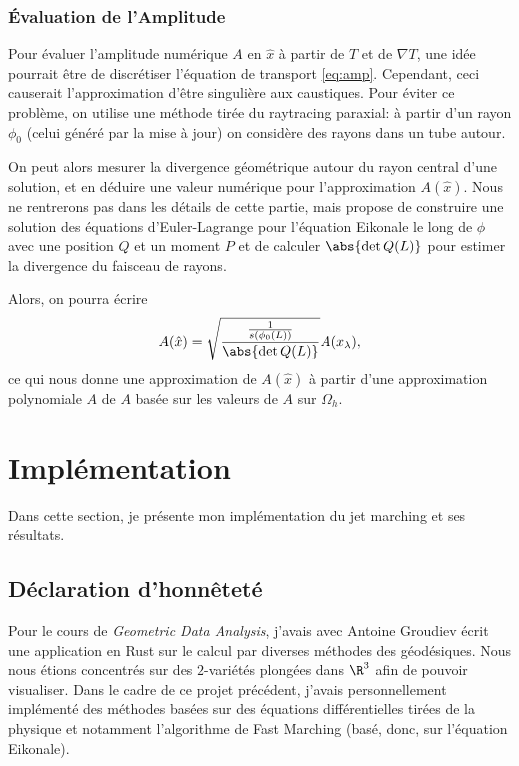 \documentclass[math, info]{mpb-cours}
\begin{document}
\subsubsection{Évaluation de l'Amplitude}
Pour évaluer l'amplitude numérique $A$ en $\hat{x}$ à partir de $T$ et de $\nabla T$, une idée pourrait
être de discrétiser l'équation de transport \eqref{eq:amp}.
Cependant, ceci causerait l'approximation d'être singulière aux caustiques.
Pour éviter ce problème, on utilise une méthode tirée du raytracing paraxial: à partir d'un rayon
$\phi_{0}$ (celui généré par la mise à jour) on considère des rayons dans un tube autour.

On peut alors mesurer la divergence géométrique autour du rayon central d'une solution, et en déduire une
valeur numérique pour l'approximation $A(\hat{x})$.
Nous ne rentrerons pas dans les détails de cette partie, mais \cite{potter2021jetmarchingmethodssolving}
propose de construire une solution des équations d'Euler-Lagrange pour l'équation Eikonale le long de
$\phi$ avec une position $Q$ et un moment $P$ et de calculer $\abs{\det Q(L)}$ pour estimer la
divergence du faisceau de rayons.

Alors, on pourra écrire
\begin{equation}
	A(\hat{x}) = \sqrt{\frac{\frac{1}{s(\phi_{0}(L))}}{\abs{\det Q(L)}}}\mathit{A}(x_{\lambda}),
\end{equation}
ce qui nous donne une approximation de $A(\hat{x})$ à partir d'une approximation polynomiale $\mathit{A}$
de $A$ basée sur les valeurs de $A$ sur $\Omega_{h}$.

\newpage

\section{Implémentation}
Dans cette section, je présente mon implémentation du jet marching et ses résultats.

\subsection{Déclaration d'honnêteté}
Pour le cours de \textit{Geometric Data Analysis}, j'avais avec Antoine Groudiev écrit une application
en Rust sur le calcul par diverses méthodes des géodésiques.
Nous nous étions concentrés sur des $2$-variétés plongées dans $\R^{3}$ afin de pouvoir visualiser.
Dans le cadre de ce projet précédent, j'avais personnellement implémenté des méthodes basées sur des
équations différentielles tirées de la physique et notamment l'algorithme de Fast Marching (basé, donc,
sur l'équation Eikonale).
\end{document}
